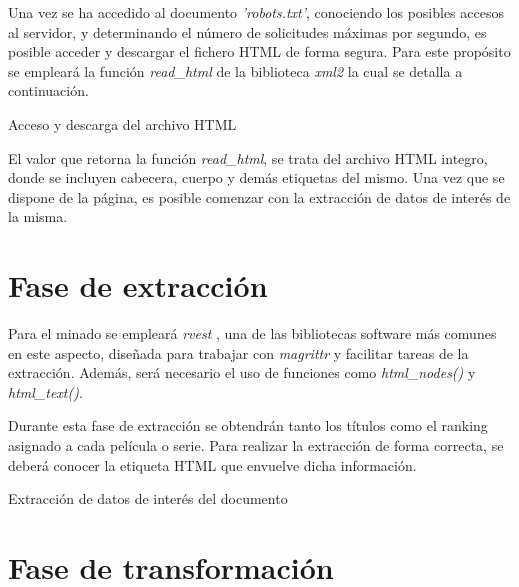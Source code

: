 

Una vez se ha accedido al documento \emph{'robots.txt'}, conociendo los posibles accesos al servidor, y
determinando el número de solicitudes máximas por segundo, es posible acceder y descargar el fichero
HTML de forma segura. Para este propósito se empleará la función \emph{read\_html} de la biblioteca
\emph{xml2} \cite{xml2-cran} la cual se detalla a continuación.

\begin{codefloat}

\caption{Acceso y descarga del archivo HTML}
\label{cod:acceso y descarga del archivo html}
\end{codefloat}

El valor que retorna la función \emph{read\_html}, se trata del archivo HTML integro, donde se incluyen
cabecera, cuerpo y demás etiquetas del mismo. Una vez que se dispone de la página, es posible comenzar
con la extracción de datos de interés de la misma.

\section{Fase de extracción}
\label{sec:fase de extraccion}

Para el minado se empleará \emph{rvest} \cite{rvest-cran}, una de las bibliotecas software más comunes en
este aspecto, diseñada para trabajar con \emph{magrittr} \cite{magrittr-cran} y facilitar tareas de la
extracción. Además, será necesario el uso de funciones como \emph{html\_nodes()} y \emph{html\_text()}.

Durante esta fase de extracción se obtendrán tanto los títulos como el ranking asignado a cada película o
serie. Para realizar la extracción de forma correcta, se deberá conocer la etiqueta HTML que envuelve dicha
información.

\begin{codefloat}

\caption{Extracción de datos de interés del documento}
\label{cod:extraccion de datos de interes del documento}
\end{codefloat}



\section{Fase de transformación}
\label{sec:fase de transformacion}

